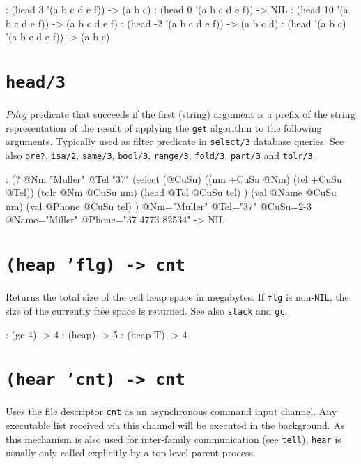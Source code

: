 \begin{wideverbatim}
: (head 3 '(a b c d e f))
-> (a b c)
: (head 0 '(a b c d e f))
-> NIL
: (head 10 '(a b c d e f))
-> (a b c d e f)
: (head -2 '(a b c d e f))
-> (a b c d)
: (head '(a b c) '(a b c d e f))
-> (a b c)
\end{wideverbatim}

 
\section*{\texttt{head/3}}
\label{sec:func-ref-H-head/3}


\emph{Pilog} predicate that succeeds if the first (string)
argument is a prefix of the string representation of the result of
applying the \texttt{get} algorithm to the following arguments. Typically used
as filter predicate in \texttt{select/3} database queries. See also \texttt{pre?},
\texttt{isa/2}, \texttt{same/3}, \texttt{bool/3}, \texttt{range/3}, \texttt{fold/3}, \texttt{part/3} and \texttt{tolr/3}.


\begin{wideverbatim}
: (?
   @Nm "Muller"
   @Tel "37"
   (select (@CuSu)
      ((nm +CuSu @Nm) (tel +CuSu @Tel))
      (tolr @Nm @CuSu nm)
      (head @Tel @CuSu tel) )
   (val @Name @CuSu nm)
   (val @Phone @CuSu tel) )
 @Nm="Muller" @Tel="37" @CuSu={2-3} @Name="Miller" @Phone="37 4773 82534"
-> NIL
\end{wideverbatim}

 
\section*{\texttt{(heap 'flg) -> cnt}}
\label{sec:func-ref-H-(heap 'flg) -> cnt}


Returns the total size of the cell heap space in megabytes. If \texttt{flg} is
non-\texttt{NIL}, the size of the currently free space is returned. See also
\texttt{stack} and \texttt{gc}.


\begin{wideverbatim}
: (gc 4)
-> 4
: (heap)
-> 5
: (heap T)
-> 4
\end{wideverbatim}

 
\section*{\texttt{(hear 'cnt) -> cnt}}
\label{sec:func-ref-H-(hear 'cnt) -> cnt}


Uses the file descriptor \texttt{cnt} as an asynchronous command input channel.
Any executable list received via this channel will be executed in the
background. As this mechanism is also used for inter-family
communication (see \texttt{tell}), \texttt{hear} is usually only called explicitly by
a top level parent process.


